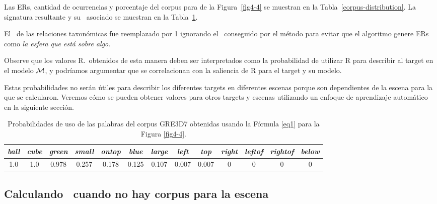 Las ERs, cantidad de ocurrencias y porcentaje del corpus para de la Figura~\ref{fig4-4} se muestran en la Tabla~\ref{corpus-distribution}. La signatura resultante y su \puse\ asociado se muestran en la Tabla~\ref{probability-of-use1}.

El \puse\ de las relaciones taxon\'omicas fue reemplazado por 1 ignorando el \puse\ conseguido por el m\'etodo para evitar que el algoritmo genere ERs como {\it la esfera que est\'a sobre algo}.

Observe que los valores R.\puse\ obtenidos de esta manera deben ser
interpretados como la probabilidad de utilizar R para describir al target en el
modelo $\mathcal{M} $, y podr\'{i}amos argumentar que se correlacionan con la
 saliencia de R para el target y su modelo. 
 
Estas probabilidades no ser\'an \'utiles
para describir los diferentes targets en diferentes escenas porque son dependientes de la escena para la que se calcularon. Veremos c\'omo se
pueden obtener valores para otros targets y escenas utilizando un
enfoque de aprendizaje autom\'atico en la siguiente secci\'on. 


\begin{table}[H]
\begin{center}
\begin{tabular}{ccccccccccccc}
\hline
\it{ball} & \it{cube} &  \it{green} & \it{small} &  \it{ontop} &  \it{blue} &  \it{large} &  \it{left} &  \it{top} &\it{right} &  \it{leftof} &    \it{rightof} &\it{below} \\
\hline

1.0 & 1.0 & 0.978 &0.257 &0.178 & 0.125 &0.107  &0.007  &0.007 & 0 &0&0&0\\
\hline
\end{tabular}
\caption{Probabilidades de uso de las palabras del corpus GRE3D7 obtenidas usando la F\'ormula \ref{eq1} para la Figura \ref{fig4-4}.}  
\label{probability-of-use1}
\end{center}
\end{table}



\subsection{Calculando \puse\ cuando no hay corpus para la escena} 
\label{subsec:learning}

%



